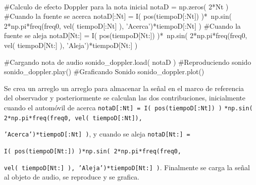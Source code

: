 \
\begin{listing}[style=python, numbers = none]
#Calculo de efecto Doppler para la nota inicial
notaD = np.zeros( 2*Nt )
#Cuando la fuente se acerca
notaD[:Nt] = I( pos(tiempoD[:Nt]) )*\
np.sin( 2*np.pi*freq(freq0, vel( tiempoD[:Nt] ), 'Acerca')*tiempoD[:Nt] )
#Cuando la fuente se aleja
notaD[Nt:] = I( pos(tiempoD[Nt:]) )*\
np.sin( 2*np.pi*freq(freq0, vel( tiempoD[Nt:] ), 'Aleja')*tiempoD[Nt:] )

#Cargando nota de audio
sonido_doppler.load( notaD )
#Reproduciendo sonido
sonido_doppler.play()
#Graficando Sonido
sonido_doppler.plot()
\end{listing}
Se crea un arreglo un arreglo para almacenar la señal en el marco de 
referencia del observador y posteriormente se calculan las dos contribuciones,
inicialmente cuando el automóvil de acerca \texttt{notaD[:Nt] = 
I( pos(tiempoD[:Nt]) )} \texttt{*np.sin( 2*np.pi*freq(freq0, vel( tiempoD[:Nt]),}

\texttt{'Acerca')*tiempoD[:Nt] )}, y cuando se aleja \texttt{notaD[Nt:] = }

\texttt{I( pos(tiempoD[Nt:]) )*np.sin( 2*np.pi*freq(freq0,} 

\texttt{vel( tiempoD[Nt:] ), 'Aleja')*tiempoD[Nt:] )}. Finalmente se carga
la señal al objeto de audio, se reproduce y se grafica.

